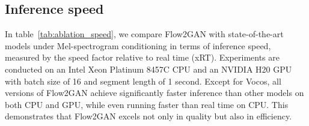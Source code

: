 \documentclass{article} %
\begin{document}
 
\begin{table}[h!]
\centering
\caption{Ablation study of model structure on LibriTTS dev set with Mel-spectrogram conditioning.}
\vspace{-0.5em}
\label{tab:ablation_network}
\setlength{\tabcolsep}{6pt} %
\vspace{-0.5em}
\end{table}

\subsection{Inference speed}
\label{ssec:speed}

In table~\ref{tab:ablation_speed}, we compare Flow2GAN with state-of-the-art models under Mel-spectrogram conditioning in terms of inference speed, measured by the speed factor relative to real time (xRT). Experiments are conducted on an Intel Xeon Platinum 8457C CPU and an NVIDIA H20 GPU with batch size of 16 and segment length of 1 second. 
Except for Vocos, 
all versions of Flow2GAN achieve significantly faster inference than other models on both CPU and GPU, while even running faster than real time on CPU. This demonstrates that Flow2GAN excels not only in quality but also in efficiency.
\end{document}
